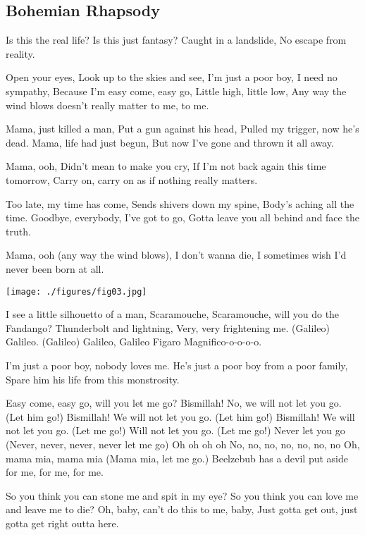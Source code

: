 \documentclass{gshs_poster_rpt}
\begin{document}
\begin{multicols}{3}
\section*{Bohemian Rhapsody}
Is this the real life?
Is this just fantasy?
Caught in a landslide,
No escape from reality.

Open your eyes,
Look up to the skies and see,
I'm just a poor boy, I need no sympathy,
Because I'm easy come, easy go,
Little high, little low,
Any way the wind blows doesn't really matter to me, to me.

Mama, just killed a man,
Put a gun against his head,
Pulled my trigger, now he's dead.
Mama, life had just begun,
But now I've gone and thrown it all away.

Mama, ooh,
Didn't mean to make you cry,
If I'm not back again this time tomorrow,
Carry on, carry on as if nothing really matters.

Too late, my time has come,
Sends shivers down my spine,
Body's aching all the time.
Goodbye, everybody, I've got to go,
Gotta leave you all behind and face the truth.

Mama, ooh (any way the wind blows),
I don't wanna die,
I sometimes wish I'd never been born at all.

\begin{center}
\texttt{[image: ./figures/fig03.jpg]}
\end{center}

I see a little silhouetto of a man,
Scaramouche, Scaramouche, will you do the Fandango?
Thunderbolt and lightning,
Very, very frightening me.
(Galileo) Galileo.
(Galileo) Galileo,
Galileo Figaro
Magnifico-o-o-o-o.

I'm just a poor boy, nobody loves me.
He's just a poor boy from a poor family,
Spare him his life from this monstrosity.

Easy come, easy go, will you let me go?
Bismillah! No, we will not let you go. (Let him go!)
Bismillah! We will not let you go. (Let him go!)
Bismillah! We will not let you go. (Let me go!)
Will not let you go. (Let me go!)
Never let you go (Never, never, never, never let me go)
Oh oh oh oh
No, no, no, no, no, no, no
Oh, mama mia, mama mia (Mama mia, let me go.)
Beelzebub has a devil put aside for me, for me, for me.

So you think you can stone me and spit in my eye?
So you think you can love me and leave me to die?
Oh, baby, can't do this to me, baby,
Just gotta get out, just gotta get right outta here.


\end{multicols}
\end{document}
